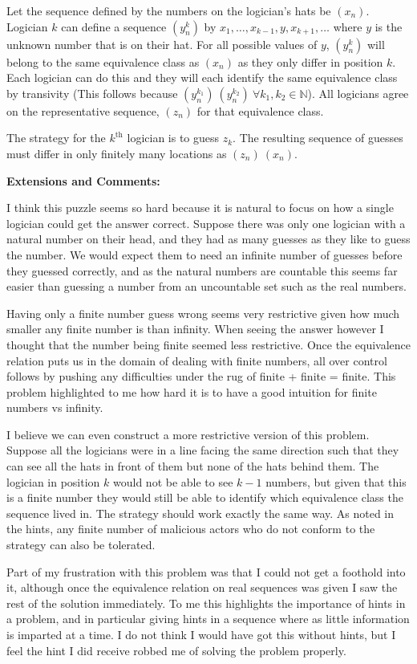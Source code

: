 Let the sequence defined by the numbers on the logician's hats be $(x_n)$. Logician $k$ can define a sequence $(y^k_n)$ by $x_1, \dots, x_{k-1}, y, x_{k+1}, \dots$ where $y$ is the unknown number that is on their hat. For all possible values of $y$, $(y^k_n)$ will belong to the same equivalence class as $(x_n)$ as they only differ in position $k$. Each logician can do this and they will each identify the same equivalence class by transivity (This follows because $(y_n^{k_1}) ~ (y_n^{k_2}) \  \forall k_1, k_2 \in \mathbb{N}$). All logicians agree on the representative sequence, $(z_n)$ for that equivalence class.

The strategy for the $k^\text{th}$ logician is to guess $z_k$. The resulting sequence of guesses must differ in only finitely many locations as $(z_n) ~ (x_n)$.

\textbf{Extensions and Comments:}

I think this puzzle seems so hard because it is natural to focus on how a single logician could get the answer correct. Suppose there was only one logician with a natural number on their head, and they had as many guesses as they like to guess the number. We would expect them to need an infinite number of guesses before they guessed correctly, and as the natural numbers are countable this seems far easier than guessing a number from an uncountable set such as the real numbers.

Having only a finite number guess wrong seems very restrictive given how much smaller any finite number is than infinity. When seeing the answer however I thought that the number being finite seemed less restrictive. Once the equivalence relation puts us in the domain of dealing with finite numbers, all over control follows by pushing any difficulties under the rug of finite + finite = finite. This problem highlighted to me how hard it is to have a good intuition for finite numbers vs infinity.

I believe we can even construct a more restrictive version of this problem. Suppose all the logicians were in a line facing the same direction such that they can see all the hats in front of them but none of the hats behind them. The logician in position $k$ would not be able to see $k - 1$ numbers, but given that this is a finite number they would still be able to identify which equivalence class the sequence lived in. The strategy should work exactly the same way. As noted in the hints, any finite number of malicious actors who do not conform to the strategy can also be tolerated.

Part of my frustration with this problem was that I could not get a foothold into it, although once the equivalence relation on real sequences was given I saw the rest of the solution immediately. To me this highlights the importance of hints in a problem, and in particular giving hints in a sequence where as little information is imparted at a time. I do not think I would have got this without hints, but I feel the hint I did receive robbed me of solving the problem properly.